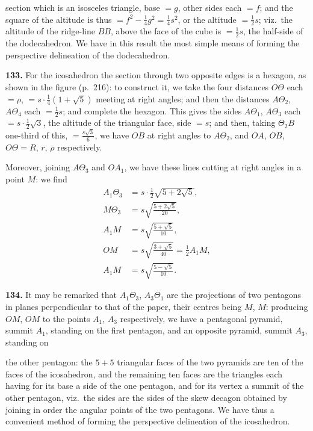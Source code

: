 \documentclass[11pt]{article}
\newcommand{\artno}[1]{\textbf{#1.}\quad}
\begin{document}
\bigskip
\noindent
section which is an isosceles triangle, base $= g$, other sides each $= f$;
and the square of the altitude is thus $= f^{2} - \tfrac{1}{4}g^{2} = \tfrac{1}{4}s^{2}$,
or the altitude $= \tfrac{1}{2}s$; viz.\ the altitude of the ridge-line $BB$,
above the face of the cube is $= \tfrac{1}{2}s$, the half-side of the
dodecahedron. We have in this result the most simple means of forming the
perspective delineation of the dodecahedron.

\medskip
\noindent
\artno{133} For the icosahedron the section through two opposite edges is a
hexagon, as shown in the figure (p.\ 216): to construct it, we take the four
distances $O\Theta$ each $= \rho$, $= s \cdot \tfrac{1}{4}(1 + \sqrt{5})$
meeting at right angles; and then the distances $A\Theta_{2}$, $A\Theta_{4}$
each $= \tfrac{1}{2}s$; and complete the hexagon. This gives the sides
$A\Theta_{1}$, $A\Theta_{3}$ each $= s \cdot \tfrac{1}{2}\sqrt{3}$, the
altitude of the triangular face, side $= s$; and then, taking $\Theta_{2}B$
one-third of this, $= \tfrac{s\sqrt{3}}{6}$, we have $OB$ at right angles to
$A\Theta_{2}$, and $OA$, $OB$, $O\Theta = R$, $r$, $\rho$ respectively.

Moreover, joining $A\Theta_{3}$ and $OA_{1}$, we have these lines cutting at
right angles in a point $M$: we find
\begin{align*}
  A_{1}\Theta_{3} &= s \cdot \tfrac{1}{2}\sqrt{5 + 2\sqrt{5}},\\
  M\Theta_{3} &= s\sqrt{\tfrac{5 + 2\sqrt{5}}{20}},\\
  A_{1}M &= s\sqrt{\tfrac{5 + \sqrt{5}}{10}},\\
  OM &= s\sqrt{\tfrac{3 + \sqrt{5}}{40}} = \tfrac{1}{2}A_{1}M,\\
  A_{1}M &= s\sqrt{\tfrac{5 - \sqrt{5}}{10}}.
\end{align*}

\medskip
\noindent
\artno{134} It may be remarked that $A_{1}\Theta_{3}$, $A_{3}\Theta_{1}$ are
the projections of two pentagons in planes perpendicular to that of the paper,
their centres being $M$, $M$: producing $OM$, $OM$ to the points $A_{1}$,
$A_{3}$ respectively, we have a pentagonal pyramid, summit $A_{1}$, standing
on the first pentagon, and an opposite pyramid, summit $A_{3}$, standing on

\bigskip
\noindent
the other pentagon: the $5 + 5$ triangular faces of the two pyramids are ten
of the faces of the icosahedron, and the remaining ten faces are the
triangles each having for its base a side of the one pentagon, and for its
vertex a summit of the other pentagon, viz.\ the sides are the sides of the
skew decagon obtained by joining in order the angular points of the two
pentagons. We have thus a convenient method of forming the perspective
delineation of the icosahedron.
\end{document}
